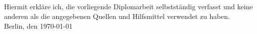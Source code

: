 \subsection*{} 
Hiermit erkl\"{a}re ich, die vorliegende Diplomarbeit selbstst\"{a}ndig verfasst und keine anderen als die angegebenen Quellen und Hilfsmittel verwendet zu haben.\\[5ex]
Berlin, den \today
